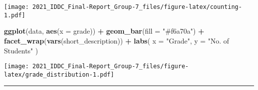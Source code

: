 \documentclass[
]{article}
\newenvironment{Shaded}{\begin{snugshade}}{\end{snugshade}}
\newcommand{\DataTypeTok}[1]{\textcolor[rgb]{0.13,0.29,0.53}{#1}}
\newcommand{\KeywordTok}[1]{\textcolor[rgb]{0.13,0.29,0.53}{\textbf{#1}}}
\newcommand{\NormalTok}[1]{#1}
\newcommand{\OperatorTok}[1]{\textcolor[rgb]{0.81,0.36,0.00}{\textbf{#1}}}
\newcommand{\StringTok}[1]{\textcolor[rgb]{0.31,0.60,0.02}{#1}}
\begin{document}
\begin{Shaded}
\end{Shaded}

\texttt{[image: 2021\_IDDC\_Final-Report\_Group-7\_files/figure-latex/counting-1.pdf]}

\begin{Shaded}
\begin{Highlighting}[]
\KeywordTok{ggplot}\NormalTok{(data, }\KeywordTok{aes}\NormalTok{(}\DataTypeTok{x =}\NormalTok{ grade)) }\OperatorTok{+}
\StringTok{  }\KeywordTok{geom_bar}\NormalTok{(}\DataTypeTok{fill =} \StringTok{"#f6a70a"}\NormalTok{) }\OperatorTok{+}
\StringTok{  }\KeywordTok{facet_wrap}\NormalTok{(}\KeywordTok{vars}\NormalTok{(short_description)) }\OperatorTok{+}
\StringTok{  }\KeywordTok{labs}\NormalTok{(}
    \DataTypeTok{x =} \StringTok{"Grade"}\NormalTok{,}
    \DataTypeTok{y =} \StringTok{"No. of Students"}
\NormalTok{  )}
\end{Highlighting}
\end{Shaded}

\texttt{[image: 2021\_IDDC\_Final-Report\_Group-7\_files/figure-latex/grade\_distribution-1.pdf]}

\begin{center}\rule{0.5\linewidth}{0.5pt}\end{center}
\end{document}
